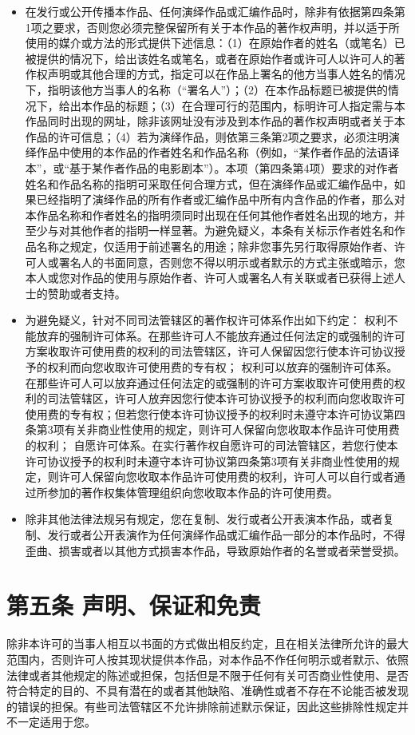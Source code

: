 \documentclass{book}
\begin{document}
\begin{itemize}
	\item 在发行或公开传播本作品、任何演绎作品或汇编作品时，除非有依据第四条第1项之要求，否则您必须完整保留所有关于本作品的著作权声明，并以适于所使用的媒介或方法的形式提供下述信息：（1）在原始作者的姓名（或笔名）已被提供的情况下，给出该姓名或笔名，或者在原始作者或许可人以许可人的著作权声明或其他合理的方式，指定可以在作品上署名的他方当事人姓名的情况下，指明该他方当事人的名称（“署名人”）；（2）在本作品标题已被提供的情况下，给出本作品的标题；（3）在合理可行的范围内，标明许可人指定需与本作品同时出现的网址，除非该网址没有涉及到本作品的著作权声明或者关于本作品的许可信息；（4）若为演绎作品，则依第三条第2项之要求，必须注明演绎作品中使用的本作品的作者姓名和作品名称（例如，“某作者作品的法语译本”，或“基于某作者作品的电影剧本”）。本项（第四条第4项）要求的对作者姓名和作品名称的指明可采取任何合理方式，但在演绎作品或汇编作品中，如果已经指明了演绎作品的所有作者或汇编作品中所有内含作品的作者，那么对本作品名称和作者姓名的指明须同时出现在任何其他作者姓名出现的地方，并至少与对其他作者的指明一样显著。为避免疑义，本条有关标示作者姓名和作品名称之规定，仅适用于前述署名的用途；除非您事先另行取得原始作者、许可人或署名人的书面同意，否则您不得以明示或者默示的方式主张或暗示，您本人或您对作品的使用与原始作者、许可人或署名人有关联或者已获得上述人士的赞助或者支持。
	\item 为避免疑义，针对不同司法管辖区的著作权许可体系作出如下约定：
	\subitem 权利不能放弃的强制许可体系。在那些许可人不能放弃通过任何法定的或强制的许可方案收取许可使用费的权利的司法管辖区，许可人保留因您行使本许可协议授予的权利而向您收取许可使用费的专有权；
	\subitem 权利可以放弃的强制许可体系。在那些许可人可以放弃通过任何法定的或强制的许可方案收取许可使用费的权利的司法管辖区，许可人放弃因您行使本许可协议授予的权利而向您收取许可使用费的专有权；但若您行使本许可协议授予的权利时未遵守本许可协议第四条第3项有关非商业性使用的规定，则许可人保留向您收取本作品许可使用费的权利；
	\subitem 自愿许可体系。在实行著作权自愿许可的司法管辖区，若您行使本许可协议授予的权利时未遵守本许可协议第四条第3项有关非商业性使用的规定，则许可人保留向您收取本作品许可使用费的权利，许可人可以自行或者通过所参加的著作权集体管理组织向您收取本作品的许可使用费。
	\item 除非其他法律法规另有规定，您在复制、发行或者公开表演本作品，或者复制、发行或者公开表演作为任何演绎作品或汇编作品一部分的本作品时，不得歪曲、损害或者以其他方式损害本作品，导致原始作者的名誉或者荣誉受损。
\end{itemize}
\section{第五条 声明、保证和免责}
除非本许可的当事人相互以书面的方式做出相反约定，且在相关法律所允许的最大范围内，否则许可人按其现状提供本作品，对本作品不作任何明示或者默示、依照法律或者其他规定的陈述或担保，包括但是不限于任何有关可否商业性使用、是否符合特定的目的、不具有潜在的或者其他缺陷、准确性或者不存在不论能否被发现的错误的担保。有些司法管辖区不允许排除前述默示保证，因此这些排除性规定并不一定适用于您。
\end{document}
